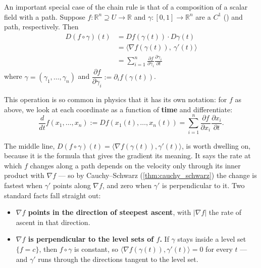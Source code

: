 An important special case of the chain rule is that of a composition of a scalar field with a
path. Suppose $f : \mathbb{R}^n \supseteq U \to \mathbb{R}$ and
$\gamma : [0,1]\to\mathbb{R}^n$ are a $C^1$  () and
path, respectively. Then
\[
\begin{aligned}
D(f\circ\gamma)(t) &= Df(\gamma(t))\cdot D\gamma(t) \\
&= \langle \nabla f(\gamma(t)),\ \gamma'(t)\rangle \\
&= \sum_{i=1}^{n} \frac{\partial f}{\partial \gamma_i}\frac{\partial \gamma_i}{\partial t}
\end{aligned}
\]
where $\gamma = (\gamma_1,\dots,\gamma_n)$ and
$\dfrac{\partial f}{\partial \gamma_i} := \partial_i f(\gamma(t))$.

This operation is so common in physics that it has its own notation: for $f$ as above, we look at
each coordinate as a function of \textbf{time} and differentiate:
\[\frac{d}{dt}f(x_1,\dots,x_n) := Df(x_1(t),\dots,x_n(t)) = \sum_{i=1}^{n}\frac{\partial f}{\partial x_i}\frac{\partial x_i}{\partial t}.\]

The middle line, $D(f\circ\gamma)(t) = \langle\nabla f(\gamma(t)),\gamma'(t)\rangle$, is worth
dwelling on, because it is the formula that gives the gradient its meaning. It says the rate at
which $f$ changes along a path depends on the velocity only through its inner product with
$\nabla f$ --- so by Cauchy--Schwarz (\cref{thm:cauchy_schwarz}) the change is fastest when
$\gamma'$ points along $\nabla f$, and zero when $\gamma'$ is perpendicular to it. Two standard
facts fall straight out:

\begin{itemize}
  \item \textbf{$\nabla f$ points in the direction of steepest ascent}, with
    $|\nabla f|$ the rate of ascent in that direction.
  \item \textbf{$\nabla f$ is perpendicular to the level sets of $f$.} If $\gamma$ stays inside
    a level set $\{f = c\}$, then $f\circ\gamma$ is constant, so
    $\langle\nabla f(\gamma(t)),\gamma'(t)\rangle = 0$ for every $t$ --- and $\gamma'$ runs
    through the directions tangent to the level set.
\end{itemize}

